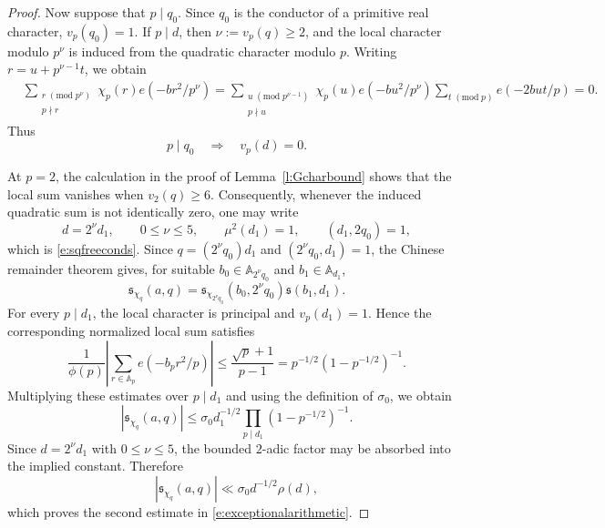 \documentclass[12pt,reqno]{amsart}
\numberwithin{equation}{section}
\theoremstyle{definition}
\theoremstyle{remark}
\begin{document}
\begin{proof}
Now suppose that \(p\mid q_0\).  Since \(q_0\) is the conductor of a
primitive real character, \(v_p(q_0)=1\).  If \(p\mid d\), then
\(\nu:=v_p(q)\geq2\), and the local character modulo \(p^\nu\) is induced
from the quadratic character modulo \(p\).  Writing
\(r=u+p^{\nu-1}t\), we obtain
\begin{align*}
 &\sum_{\substack{r\;(\mathrm{mod}\;p^\nu)\\p\nmid r}}
 \chi_p(r)e(-br^2/p^\nu)=
 \sum_{\substack{u\;(\mathrm{mod}\;p^{\nu-1})\\p\nmid u}}
 \chi_p(u)e(-bu^2/p^\nu)
 \sum_{t\;(\mathrm{mod}\;p)}e(-2but/p)
 =0.
\end{align*}
Thus
\[
 p\mid q_0\quad\Longrightarrow\quad v_p(d)=0.
\]

At \(p=2\), the calculation in the proof of
Lemma~\ref{l:Gcharbound} shows that the local sum vanishes when
\(v_2(q)\geq6\).  Consequently, whenever the induced quadratic sum is
not identically zero, one may write
\[
 d=2^\nu d_1,\qquad
 0\leq\nu\leq5,\qquad
 \mu^2(d_1)=1,\qquad
 (d_1,2q_0)=1,
\]
which is \eqref{e:sqfreeconds}. Since \(q=(2^\nu q_0)d_1\) and
\((2^\nu q_0,d_1)=1\), the Chinese remainder theorem gives, for
suitable \(b_0\in\mathbb A_{2^\nu q_0}\) and
\(b_1\in\mathbb A_{d_1}\),
\[
 \mathfrak s_{\chi_q}(a,q)
 =
 \mathfrak s_{\chi_{2^\nu q_0}}(b_0,2^\nu q_0)
 \mathfrak s(b_1,d_1).
\]
For every \(p\mid d_1\), the local character is principal and
\(v_p(d_1)=1\).  Hence the corresponding normalized local sum
satisfies
\[
 \frac1{\phi(p)}
 \left|\sum_{r\in\mathbb A_p}e(-b_pr^2/p)\right|
 \leq\frac{\sqrt p+1}{p-1}
 =p^{-1/2}(1-p^{-1/2})^{-1}.
\]
Multiplying these estimates over \(p\mid d_1\) and using the definition
of \(\sigma_0\), we obtain
\[
 |\mathfrak s_{\chi_q}(a,q)|
 \leq
 \sigma_0d_1^{-1/2}
 \prod_{p\mid d_1}(1-p^{-1/2})^{-1}.
\]
Since \(d=2^\nu d_1\) with \(0\leq\nu\leq5\), the bounded \(2\)-adic
factor may be absorbed into the implied constant.  Therefore
\[
 |\mathfrak s_{\chi_q}(a,q)|
 \ll \sigma_0d^{-1/2}\rho(d),
\]
which proves the second estimate in
\eqref{e:exceptionalarithmetic}.



\end{proof}
\end{document}
